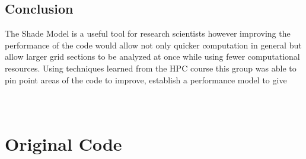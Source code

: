\documentclass[]{article}%
\begin{document}
\subsection{Conclusion}

The Shade Model is a useful tool for research scientists however improving the performance of the code would allow not only quicker computation in general but allow larger grid sections to be analyzed at once while using fewer computational resources. Using techniques learned from the HPC course this group was able to pin point areas of the code to improve, establish a performance model to give 





\newpage
\appendix
\section{\\Original Code} \label{App:AppendixA}

{\small














}


%
%
\end{document}

